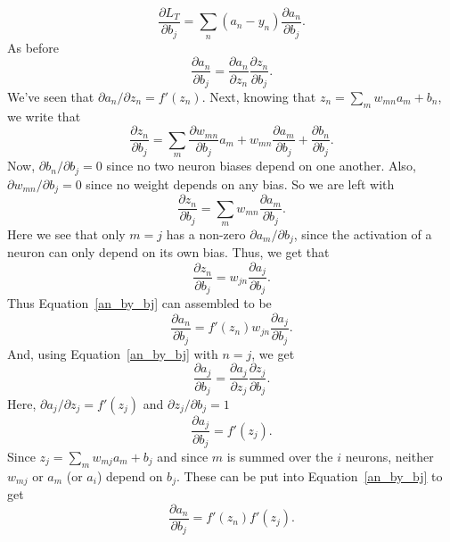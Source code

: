 \documentclass[12pt]{article}
\begin{document}
\begin{equation}
\frac{\partial L_T}{\partial b_j}=\sum_n (a_n-y_n)\frac{\partial a_n}{\partial b_j}.
\label{LT_by_bj}
\end{equation}
As before
\begin{equation}
\frac{\partial a_n}{\partial b_j}=\frac{\partial a_n}{\partial z_n}\frac{\partial z_n}{\partial b_j}.
\label{an_by_bj}
\end{equation}
We've seen that ${\partial a_n}/{\partial z_n}=f'(z_n)$. Next, knowing that $z_n=\sum_m w_{mn}a_m+b_n$, we write that
\begin{equation}
\frac{\partial z_n}{\partial b_j}=\sum_m\frac{\partial w_{mn}}{\partial b_j}a_m+w_{mn}\frac{\partial a_m}{\partial b_j}+\frac{\partial b_n}{\partial b_j}.
\end{equation}
Now, ${\partial b_n}/{\partial b_j}=0$ since no two neuron biases depend on one another. Also, ${\partial w_{mn}}/{\partial b_j}=0$ since no weight depends on any bias.  So we are left with
\begin{equation}
\frac{\partial z_n}{\partial b_j}=\sum_m w_{mn}\frac{\partial a_m}{\partial b_j}.
\end{equation}
Here we see that only $m=j$ has a non-zero ${\partial a_m}/{\partial b_j}$, since the activation of a neuron can only depend on its own bias. Thus, we get that 
\begin{equation}
\frac{\partial z_n}{\partial b_j}=w_{jn}\frac{\partial a_j}{\partial b_j}.
\end{equation}
Thus Equation~\ref{an_by_bj} can assembled to be
\begin{equation}
\frac{\partial a_n}{\partial b_j}=f'(z_n)w_{jn}\frac{\partial a_j}{\partial b_j}.
\end{equation}
And, using Equation~\ref{an_by_bj} with $n=j$, we get
\begin{equation}
\frac{\partial a_j}{\partial b_j}=\frac{\partial a_j}{\partial z_j}\frac{\partial z_j}{\partial b_j}.
\end{equation}
Here, ${\partial a_j}/{\partial z_j}=f'(z_j)$ and ${\partial z_j}/{\partial b_j}=1$
\begin{equation}
\frac{\partial a_j}{\partial b_j}=f'(z_j).
\end{equation}
Since $z_j=\sum_m w_{mj}a_m+b_j$ and since  $m$ is summed over the $i$ neurons, neither $w_{mj}$ or $a_m$ (or $a_i$) depend on $b_j$.
These can be put into Equation~\ref{an_by_bj} to get
\begin{equation}
\frac{\partial a_n}{\partial b_j}=f'(z_n)f'(z_j).
\label{an_by_bj1}
\end{equation}
\end{document}
